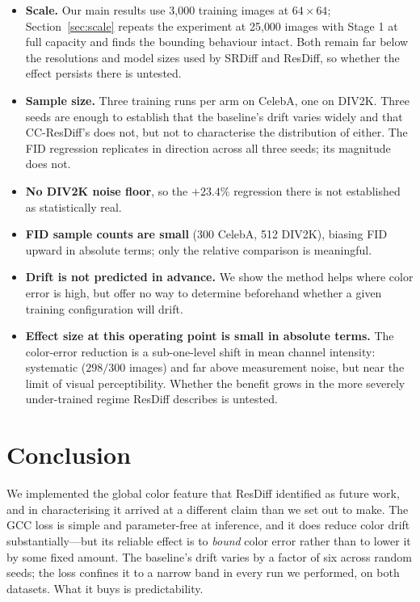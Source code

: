 \documentclass[11pt]{article}
\begin{document}
\begin{itemize}
\item \textbf{Scale.} Our main results use 3{,}000 training images at
$64\times64$; Section~\ref{sec:scale} repeats the experiment at 25{,}000 images
with Stage 1 at full capacity and finds the bounding behaviour intact. Both
remain far below the resolutions and model sizes used by SRDiff and ResDiff, so
whether the effect persists there is untested.
\item \textbf{Sample size.} Three training runs per arm on CelebA, one on DIV2K.
Three seeds are enough to establish that the baseline's drift varies widely and
that CC-ResDiff's does not, but not to characterise the distribution of either.
The FID regression replicates in direction across all three seeds; its magnitude
does not.
\item \textbf{No DIV2K noise floor}, so the $+23.4\%$ regression there is not
established as statistically real.
\item \textbf{FID sample counts are small} (300 CelebA, 512 DIV2K), biasing FID
upward in absolute terms; only the relative comparison is meaningful.
\item \textbf{Drift is not predicted in advance.} We show the method helps where
color error is high, but offer no way to determine beforehand whether a given
training configuration will drift.
\item \textbf{Effect size at this operating point is small in absolute terms.}
The color-error reduction is a sub-one-level shift in mean channel intensity:
systematic ($298/300$ images) and far above measurement noise, but near the limit
of visual perceptibility. Whether the benefit grows in the more severely
under-trained regime ResDiff describes is untested.
\end{itemize}

\section{Conclusion}

We implemented the global color feature that ResDiff identified as future work,
and in characterising it arrived at a different claim than we set out to make.
The GCC loss is simple and parameter-free at inference, and it does reduce color
drift substantially---but its reliable effect is to \emph{bound} color error
rather than to lower it by some fixed amount. The baseline's drift varies by a
factor of six across random seeds; the loss confines it to a narrow band in every
run we performed, on both datasets. What it buys is predictability.
\end{document}
